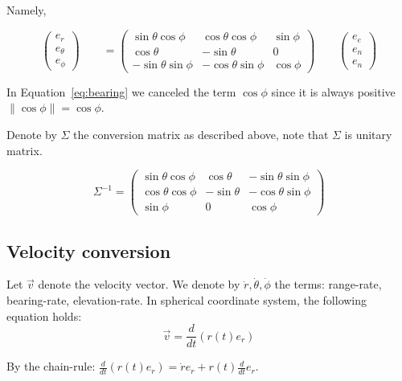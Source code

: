 \documentclass{article}
\newcommand{\east}{e_e}
\newcommand{\north}{e_n}
\newcommand{\up}{e_n}
\newcommand{\range}{e_r}
\newcommand{\bearing}{e_\theta}
\newcommand{\elevation}{e_\phi}
\newcommand{\rrate}{\dot{r}}
\newcommand{\brate}{\dot{\theta}}
\newcommand{\erate}{\dot{\phi}}
\begin{document}
Namely,

\begin{equation}\label{eq:matrix}
\begin{pmatrix}
    \range \\
   \bearing \\
    \elevation
  \end{pmatrix}
  \qquad
  = \begin{pmatrix}
    \sin \theta \cos \phi & \cos \theta \cos \phi &  \sin \phi \\
   \cos \theta &  -\sin \theta & 0 \\
    -\sin \theta \sin \phi & -\cos \theta \sin \phi &  \cos \phi
  \end{pmatrix}
  \qquad
  \begin{pmatrix}
    \east \\
   \north \\
    \up
  \end{pmatrix}
\end{equation}

In Equation~\ref{eq:bearing} we canceled the term $\cos \phi$
since it is always positive $\| \cos \phi \| = \cos \phi$.

Denote by $\Sigma$ the conversion matrix as described above, note that $\Sigma$
is unitary matrix.

\begin{equation}
\Sigma^{-1} = \begin{pmatrix}
    \sin \theta \cos \phi & \cos \theta &  - \sin \theta \sin \phi \\
   \cos \theta \cos \phi &  -\sin \theta & -\cos \theta \sin \phi \\
    \sin \phi & 0 &  \cos \phi
  \end{pmatrix}
\end{equation}

\subsection{Velocity conversion}
Let $\vec{v}$ denote the velocity vector. We denote by $\rrate, \brate, \erate$ the terms: range-rate, bearing-rate,
elevation-rate.
In spherical coordinate system, the
following equation holds:
\begin{equation}
\vec{v} = \frac{d}{dt} (r(t) \range)
\end{equation}

By the chain-rule: $\frac{d}{dt} (r(t) \range) = \rrate \range + r(t)
\frac{d}{dt} \range$.
\end{document}
